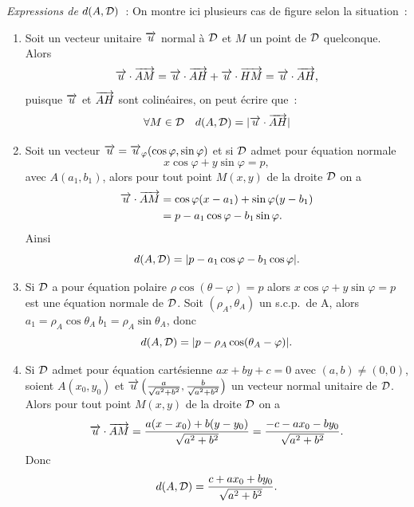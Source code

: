 \emph{Expressions de \(d(A , \mathcal{D})\)}~:
On montre ici plusieurs cas de figure selon la situation~:
\begin{enumerate}
    \item Soit un vecteur unitaire \(\overrightarrow{u}\) normal à \(\mathcal{D}\) et \(M\) un point de 
        \(\mathcal{D}\) quelconque. Alors
        \begin{equation}
            \overrightarrow{u} \cdot \overrightarrow{AM} = \overrightarrow{u} \cdot \overrightarrow{AH} + \overrightarrow{u} \cdot \overrightarrow{HM} = 
            \overrightarrow{u} \cdot \overrightarrow{AH},
        \end{equation}
        puisque \(\overrightarrow{u}\) et \(\overrightarrow{AH}\) sont colinéaires, on peut écrire que~:
        \begin{equation}
            \forall M \in \mathcal{D} \quad d(A , \mathcal{D}) = |\overrightarrow{u} \cdot \overrightarrow{AH}|
        \end{equation}
    \item Soit un vecteur \(\overrightarrow{u} = \overrightarrow{u}_\varphi(\cos \varphi, \sin \varphi)\) et 
        si \(\mathcal{D}\) admet pour équation normale
        \begin{equation}
            x \cos \varphi + y \sin \varphi = p,
        \end{equation}
        avec \(A(a_1 , b_1)\), alors pour tout point \(M(x , y)\) de la droite 
        \(\mathcal{D}\) on a
        \begin{align}
            \overrightarrow{u} \cdot \overrightarrow{AM} &= \cos \varphi (x - a_1) + \sin \varphi (y - b_1)\\
                                &= p - a_1\cos\varphi -b_1\sin\varphi.
        \end{align}
        Ainsi
        \begin{equation}
            d(A , \mathcal{D}) = |p - a_1\cos\varphi - b_1\cos\varphi|.
        \end{equation}
    \item Si \(\mathcal{D}\) a pour équation polaire \(\rho\cos(\theta - \varphi) = p\) 
        alors \(x \cos \varphi + y \sin \varphi = p\) est une équation normale 
        de \(\mathcal{D}\). Soit \((\rho_A , \theta_A)\) un s.c.p.\ de A, alors \(a_1 = 
        \rho_A\cos\theta_A \ b_1 = \rho_A\sin\theta_A\), donc
        \begin{equation}
            d(A , \mathcal{D}) = |p - \rho_A\cos(\theta_A - \varphi)|.
        \end{equation}
    \item Si \(\mathcal{D}\) admet pour équation cartésienne \(ax + by + c = 0\) avec 
        \((a , b) \neq (0 , 0)\), soient \(A(x_0 , y_0)\) et \(\overrightarrow{u} 
        \left(\frac{a}{\sqrt{a^2 + b^2}}, \frac{b}{\sqrt{a^2 + b^2}}\right)\) un 
        vecteur normal unitaire de \(\mathcal{D}\). Alors pour tout point \(M(x , y)\) de 
        la droite \(\mathcal{D}\) on a
        \begin{equation}
            \overrightarrow{u}\cdot\overrightarrow{AM} = \frac{a(x - x_0) + b(y - y_0)}{\sqrt{a^2 + b^2}} = 
            \frac{-c - ax_0 - by_0}{\sqrt{a^2 + b^2}}.
        \end{equation}
        Donc
        \begin{equation}
            d(A , \mathcal{D}) = \frac{c + ax_0 + by_0}{\sqrt{a^2 + b^2}}.
        \end{equation}
\end{enumerate}

